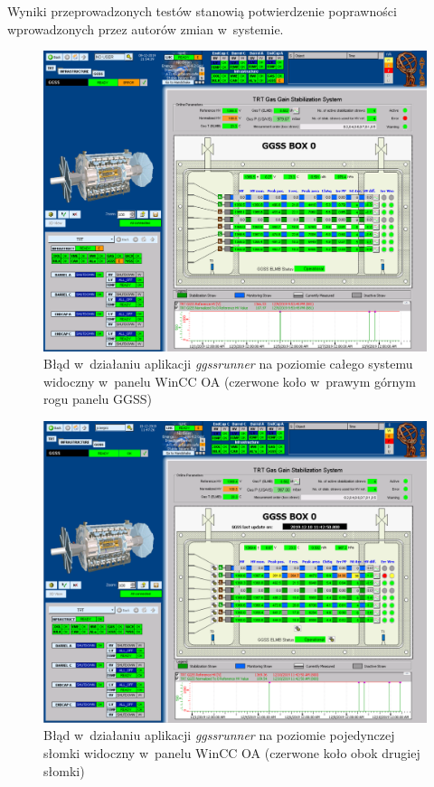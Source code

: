 Wyniki przeprowadzonych testów stanowią potwierdzenie poprawności wprowadzonych przez autorów zmian w~systemie. 

\begin{figure}
\centering
\caption{Błąd w~działaniu aplikacji \textit{ggssrunner} na poziomie całego systemu widoczny w~panelu WinCC OA (czerwone koło w~prawym górnym rogu panelu GGSS)}
\label{fig:ggssErrorScada}
\includegraphics[width=\textwidth]{res/png/ggssError}
\end{figure}


\begin{figure}
\centering
\caption{Błąd w~działaniu aplikacji \textit{ggssrunner} na poziomie pojedynczej słomki widoczny w~panelu WinCC OA (czerwone koło obok drugiej słomki)}
\label{fig:ggssErrorStrawScada}
\includegraphics[width=\textwidth]{res/png/errStraw}
\end{figure}
